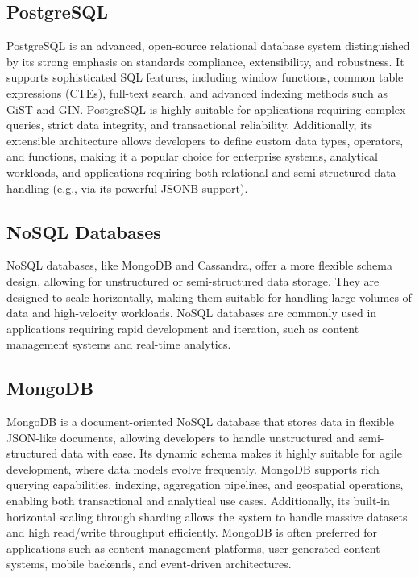 \subsection*{PostgreSQL}

PostgreSQL is an advanced, open-source relational database system distinguished by its strong emphasis on standards compliance, extensibility, and robustness. It supports sophisticated SQL features, including window functions, common table expressions (CTEs), full-text search, and advanced indexing methods such as GiST and GIN. PostgreSQL is highly suitable for applications requiring complex queries, strict data integrity, and transactional reliability. Additionally, its extensible architecture allows developers to define custom data types, operators, and functions, making it a popular choice for enterprise systems, analytical workloads, and applications requiring both relational and semi-structured data handling (e.g., via its powerful JSONB support).\cite{postgresql}

\subsection{NoSQL Databases}

NoSQL databases, like MongoDB and Cassandra, offer a more flexible schema design, allowing for unstructured or semi-structured data storage. They are designed to scale horizontally, making them suitable for handling large volumes of data and high-velocity workloads. NoSQL databases are commonly used in applications requiring rapid development and iteration, such as content management systems and real-time analytics.\\

\subsection*{MongoDB}

MongoDB is a document-oriented NoSQL database that stores data in flexible JSON-like documents, allowing developers to handle unstructured and semi-structured data with ease. Its dynamic schema makes it highly suitable for agile development, where data models evolve frequently. MongoDB supports rich querying capabilities, indexing, aggregation pipelines, and geospatial operations, enabling both transactional and analytical use cases. Additionally, its built-in horizontal scaling through sharding allows the system to handle massive datasets and high read/write throughput efficiently. MongoDB is often preferred for applications such as content management platforms, user-generated content systems, mobile backends, and event-driven architectures.\cite{mongodb} \\

